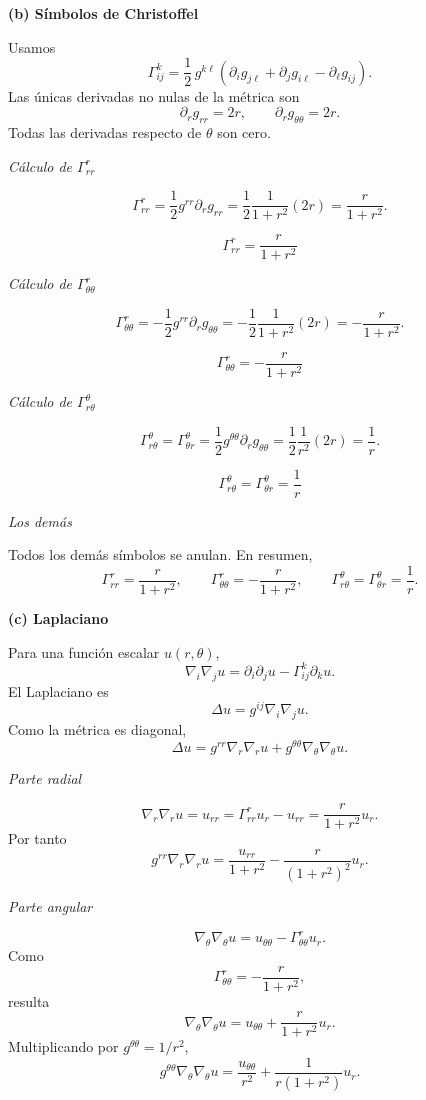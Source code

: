 \documentclass[11pt,spanish]{article}
\begin{document}
{\bf (b) Símbolos de Christoffel}

Usamos
$$
\Gamma^k_{ij}
=
\frac12\,g^{k\ell}
\left(
\partial_i g_{j\ell}
+
\partial_j g_{i\ell}
-
\partial_\ell g_{ij}
\right).
$$
Las únicas derivadas no nulas de la métrica son
$$
\partial_r g_{rr}=2r,
\qquad
\partial_r g_{\theta\theta}=2r.
$$
Todas las derivadas respecto de $\theta$ son cero.

{\em Cálculo de $\Gamma^r_{rr}$}

$$
\Gamma^r_{rr}
=
\frac12 g^{rr}\partial_r g_{rr}
=
\frac12\frac1{1+r^2}(2r)
=
\frac{r}{1+r^2}.
$$

$$
\boxed{\Gamma^r_{rr}=\frac{r}{1+r^2}}
$$

{\em Cálculo de $\Gamma^r_{\theta\theta}$}

$$
\Gamma^r_{\theta\theta}
=
-\frac12 g^{rr}\partial_r g_{\theta\theta}
=
-\frac12\frac1{1+r^2}(2r)
=
-\frac{r}{1+r^2}.
$$

$$
\boxed{\Gamma^r_{\theta\theta}
=
-\frac{r}{1+r^2}}
$$

{\em Cálculo de $\Gamma^\theta_{r\theta}$}

$$
\Gamma^\theta_{r\theta}
=
\Gamma^\theta_{\theta r}
=
\frac12 g^{\theta\theta}
\partial_r g_{\theta\theta}
=
\frac12\frac1{r^2}(2r)
=
\frac1r.
$$

$$
\boxed{
\Gamma^\theta_{r\theta}
=
\Gamma^\theta_{\theta r}
=
\frac1r
}
$$

{\em Los demás}

Todos los demás símbolos se anulan.
En resumen,
$$
\boxed{
\Gamma^r_{rr}=\frac{r}{1+r^2},
\qquad
\Gamma^r_{\theta\theta}
=
-\frac{r}{1+r^2},
\qquad
\Gamma^\theta_{r\theta}
=
\Gamma^\theta_{\theta r}
=
\frac1r.
}
$$

{\bf (c) Laplaciano}

Para una función escalar $u(r,\theta)$,
$$
\nabla_i\nabla_j u
=
\partial_i\partial_j u
-
\Gamma^k_{ij}\partial_k u.
$$
El Laplaciano es
$$
\Delta u
=
g^{ij}\nabla_i\nabla_j u.
$$
Como la métrica es diagonal,
$$
\Delta u
=
g^{rr}\nabla_r\nabla_r u
+
g^{\theta\theta}\nabla_\theta\nabla_\theta u.
$$

{\em Parte radial}

$$
\nabla_r\nabla_r u
=
u_{rr}
=
\Gamma^r_{rr}u_r
-
u_{rr}
=
\frac{r}{1+r^2}u_r.
$$
Por tanto
$$
g^{rr}\nabla_r\nabla_r u
=
\frac{u_{rr}}{1+r^2}
-
\frac{r}{(1+r^2)^2}u_r.
$$

{\em Parte angular}

$$
\nabla_\theta\nabla_\theta u
=
u_{\theta\theta}
-
\Gamma^r_{\theta\theta}u_r.
$$
Como
$$
\Gamma^r_{\theta\theta}
=
-\frac{r}{1+r^2},
$$
resulta
$$
\nabla_\theta\nabla_\theta u
=
u_{\theta\theta}
+
\frac{r}{1+r^2}u_r.
$$
Multiplicando por $g^{\theta\theta}=1/r^2$,
$$
g^{\theta\theta}\nabla_\theta\nabla_\theta u
=
\frac{u_{\theta\theta}}{r^2}
+
\frac1{r(1+r^2)}u_r.
$$
\end{document}
